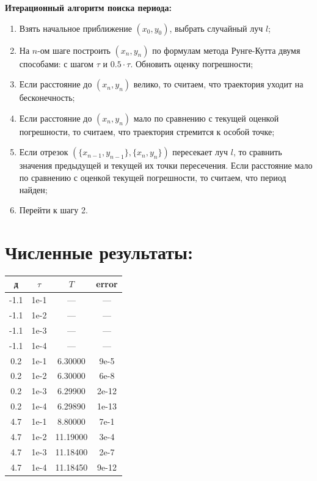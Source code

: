 \documentclass[12pt,a4paper]{article}
\begin{document}
\textbf{Итерационный алгоритм поиска периода:}

\begin{enumerate}
\item Взять начальное приближение $(x_0, y_0)$, выбрать случайный луч $l$;
\item На $n$-ом шаге построить $(x_n, y_n)$ по формулам метода Рунге-Кутта двумя способами: с шагом $\tau$ и $0.5 \cdot \tau$. Обновить оценку погрешности;
\item Если расстояние до $(x_n, y_n)$ велико, то считаем, что траектория уходит на бесконечность;
\item Если расстояние до $(x_n, y_n)$ мало по сравнению с текущей оценкой погрешности, то считаем, что траектория стремится к особой точке;
\item Если отрезок $(\{x_{n-1}, y_{n - 1}\}, \{x_n, y_n\})$ пересекает луч $l$, то сравнить значения предыдущей и текущей их точки пересечения. Если расстояние мало по сравнению с оценкой текущей погрешности, то считаем, что период найден;
\item Перейти к шагу 2.
\end{enumerate}

\section{Численные результаты:}

\begin{tabular}{|c|c|c|c|}
\hline 
д & $\tau$ & $T$ & error \\ 
\hline 
-1.1 & 1e-1 & --- & --- \\ 
\hline 
-1.1 & 1e-2 & --- & --- \\ 
\hline 
-1.1 & 1e-3 & --- & --- \\ 
\hline 
-1.1 & 1e-4 & --- & --- \\ 
\hline 
0.2 & 1e-1 & 6.30000 & 9e-5 \\ 
\hline 
0.2 & 1e-2 & 6.30000 & 6e-8 \\ 
\hline 
0.2 & 1e-3 & 6.29900 & 2e-12 \\ 
\hline 
0.2 & 1e-4 & 6.29890 & 1e-13 \\ 
\hline 
4.7 & 1e-1 & 8.80000 & 7e-1 \\ 
\hline 
4.7 & 1e-2 & 11.19000 & 3e-4 \\ 
\hline 
4.7 & 1e-3 & 11.18400 & 2e-7 \\ 
\hline 
4.7 & 1e-4 & 11.18450 & 9e-12 \\ 
\hline 
\end{tabular} 
\end{document}
